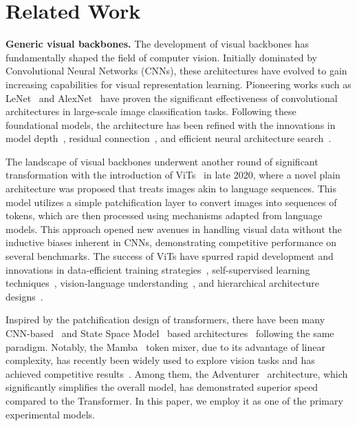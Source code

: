 \section{Related Work}
\label{sec:rel}

\textbf{Generic visual backbones.} The development of visual backbones has fundamentally shaped the field of computer vision. Initially dominated by Convolutional Neural Networks (CNNs), these architectures have evolved to gain increasing capabilities for visual representation learning. Pioneering works such as LeNet~\cite{lenet} and AlexNet~\cite{alexnet} have proven the significant effectiveness of convolutional architectures in large-scale image classification tasks. Following these foundational models, the architecture has been refined with the innovations in model depth~\cite{vgg}, residual connection~\cite{resnet,densenet}, and efficient neural architecture search~\cite{efficientnet}.

The landscape of visual backbones underwent another round of significant transformation with the introduction of ViTs~\cite{vit} in late 2020, where a novel plain architecture was proposed that treats images akin to language sequences. This model utilizes a simple patchification layer to convert images into sequences of tokens, which are then processed using mechanisms adapted from language models. This approach opened new avenues in handling visual data without the inductive biases inherent in CNNs, demonstrating competitive performance on several benchmarks. The success of ViTs have spurred rapid development and innovations in data-efficient training strategies~\cite{deit,3things,deit3}, self-supervised learning techniques~\cite{dino,mocov3,beit,mae}, vision-language understanding~\cite{clip,align,llava,flamingo,coca}, and hierarchical architecture designs~\cite{swin,crossvit,t2tvit,metaformer}.

Inspired by the patchification design of transformers, there have been many CNN-based~\cite{convnext} and State Space Model~\cite{ssm-control,ssm1,ssm2} based architectures~\cite{vim,mambar,adventurer} following the same paradigm. Notably, the Mamba~\cite{mamba,mamba2} token mixer, due to its advantage of linear complexity, has recently been widely used to explore vision tasks and has achieved competitive results~\cite{vim,mambar,adventurer,arm,vmamba,plainmamba,mambavision,localmamba,videomamba,jamba}. Among them, the Adventurer~\cite{adventurer} architecture, which significantly simplifies the overall model, has demonstrated superior speed compared to the Transformer. In this paper, we employ it as one of the primary experimental models.

